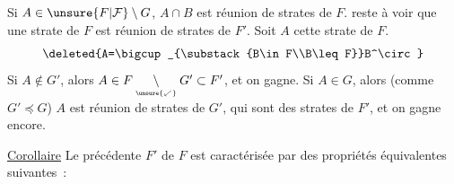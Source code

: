 Si $A\in \unsure{F|\mathcal F}\setminus G$, $A\cap B$ est réunion de strates de $F$.  reste à voir que une strate  de $F$ est réunion de strates de $F'$. Soit $A$ cette strate de $F$. 
\[
 \deleted{A=\bigcup_{\substack{B\in F\\B\leq F}}B^\circ}
\]
Si $A\notin G'$, alors $A\in F\underset{\scriptscriptstyle\unsure{\swarrow}}{\setminus}G'\subset F'$, et on gagne. Si $A\in G$, alors (comme $G'\preceq G$) $A$ est réunion de strates de $G'$, qui sont des strates de $F'$, et on gagne encore.

\uline{Corollaire} Le  précédente $F'$ de $F$ est caractérisée par  des propriétés équivalentes suivantes~:

